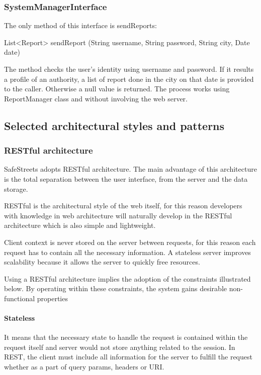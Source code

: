 \subsubsection{SystemManagerInterface}

The only method of this interface is sendReports:
\hfill

List<Report> sendReport (String username, String password, String city, Date date)



The method checks the user's identity using username and password. If it results a profile of an authority, a list of report done in the city on that date is provided to the caller. Otherwise a null value is returned.
The process works using ReportManager class and without involving the web server.


\subsection{Selected architectural styles and patterns}

\subsubsection{RESTful architecture}
SafeStreets adopts RESTful architecture. The main advantage of this architecture is the total separation between the user interface, from the server and the data storage.

RESTful is the architectural style of the web itself, for this reason developers with knowledge in web architecture will naturally develop in the RESTful architecture which is also simple and lightweight.

Client context is never stored on the server between requests, for this reason each request has to contain all the necessary information. 
A stateless server improves scalability because it allows the server to quickly free resources.

Using a RESTful architecture implies the adoption of the constraints illustrated below.
By operating within these constraints, the system gains desirable non-functional properties

\paragraph{Stateless}
It means that the necessary state to handle the request is contained within the request itself and server would not store anything related to the session. In REST, the client must include all information for the server to fulfill the request whether as a part of query params, headers or URI.

